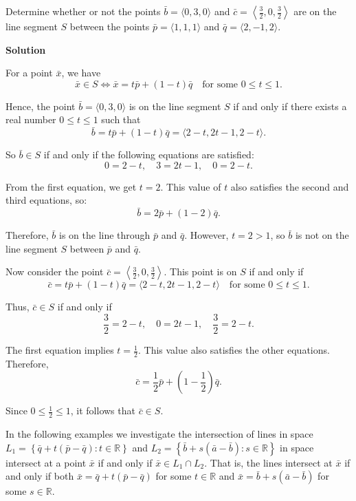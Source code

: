 \begin{examplebox}
Determine whether or not the points \(\bar{b} = \langle 0, 3, 0 \rangle\) and \(\bar{c} = \left\langle \frac{3}{2}, 0, \frac{3}{2} \right\rangle\) are on the line segment \(S\) between the points \(\bar{p} = \langle 1, 1, 1 \rangle\) and \(\bar{q} = \langle 2, -1, 2 \rangle\).
\vspace{1em}

\textbf{Solution} 
\vspace{1em}

For a point \(\bar{x}\), we have
\[
\bar{x} \in S \iff \bar{x} = t\bar{p} + (1 - t)\bar{q} \quad \text{for some } 0 \leq t \leq 1.
\]

Hence, the point \(\bar{b} = \langle 0, 3, 0 \rangle\) is on the line segment \(S\) if and only if there exists a real number \(0 \leq t \leq 1\) such that
\[
\bar{b} = t\bar{p} + (1 - t)\bar{q} = \langle 2 - t, 2t - 1, 2 - t \rangle.
\]

So \(\bar{b} \in S\) if and only if the following equations are satisfied:
\[
0 = 2 - t, \quad 3 = 2t - 1, \quad 0 = 2 - t.
\]

From the first equation, we get \(t = 2\). This value of \(t\) also satisfies the second and third equations, so:
\[
\bar{b} = 2\bar{p} + (1 - 2)\bar{q}.
\]

Therefore, \(\bar{b}\) is on the line through \(\bar{p}\) and \(\bar{q}\). However, \(t = 2 > 1\), so \(\bar{b}\) is not on the line segment \(S\) between \(\bar{p}\) and \(\bar{q}\).

Now consider the point \(\bar{c} = \left\langle \frac{3}{2}, 0, \frac{3}{2} \right\rangle\). This point is on \(S\) if and only if
\[
\bar{c} = t\bar{p} + (1 - t)\bar{q} = \langle 2 - t, 2t - 1, 2 - t \rangle \quad \text{for some } 0 \leq t \leq 1.
\]

Thus, \(\bar{c} \in S\) if and only if
\[
\frac{3}{2} = 2 - t, \quad 0 = 2t - 1, \quad \frac{3}{2} = 2 - t.
\]

The first equation implies \(t = \frac{1}{2}\). This value also satisfies the other equations. Therefore,
\[
\bar{c} = \frac{1}{2} \bar{p} + \left(1 - \frac{1}{2}\right) \bar{q}.
\]

Since \(0 \leq \frac{1}{2} \leq 1\), it follows that \(\bar{c} \in S\).
\end{examplebox}

In the following examples we investigate the intersection of lines in space
$L_1 = \left\{ \bar{q} + t(\bar{p} - \bar{q}) : t \in \mathbb{R} \right\}$ and $L_2 = \left\{ \bar{b} + s(\bar{a} - \bar{b}) : s \in \mathbb{R} \right\}$
in space intersect at a point \(\bar{x}\) if and only if \(\bar{x} \in L_1 \cap L_2\). That is, the lines intersect at \(\bar{x}\) if and only if both
$\bar{x} = \bar{q} + t(\bar{p} - \bar{q})$ for some $t \in \mathbb{R}$ and $\bar{x} = \bar{b} + s(\bar{a} - \bar{b})$ for some  $s \in \mathbb{R}.$

